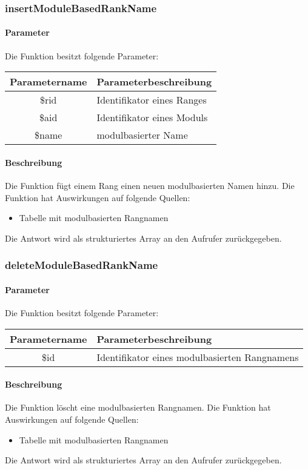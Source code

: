 \subsubsection{insertModuleBasedRankName}
\paragraph{Parameter} Die Funktion besitzt folgende Parameter:
\begin{table}[H]
	\begin{tabular}{|c|p{11cm}|}
		\hline
		\textbf{Parametername} & \textbf{Parameterbeschreibung} \\ \hline
		\$rid  & Identifikator eines Ranges \\ \hline
		\$aid  & Identifikator eines Moduls \\ \hline
		\$name & modulbasierter Name \\ \hline
	\end{tabular}
\end{table}
\paragraph{Beschreibung} Die Funktion fügt einem Rang einen neuen modulbasierten Namen hinzu. Die Funktion hat Auswirkungen auf folgende Quellen:
\begin{itemize}
	\item Tabelle mit modulbasierten Rangnamen
\end{itemize}
Die Antwort wird als strukturiertes Array an den Aufrufer zurückgegeben.
\subsubsection{deleteModuleBasedRankName}
\paragraph{Parameter} Die Funktion besitzt folgende Parameter:
\begin{table}[H]
	\begin{tabular}{|c|p{11cm}|}
		\hline
		\textbf{Parametername} & \textbf{Parameterbeschreibung} \\ \hline
		\$id  & Identifikator eines modulbasierten Rangnamens \\ \hline
	\end{tabular}
\end{table}
\paragraph{Beschreibung} Die Funktion löscht eine modulbasierten Rangnamen. Die Funktion hat Auswirkungen auf folgende Quellen:
\begin{itemize}
	\item Tabelle mit modulbasierten Rangnamen
\end{itemize}
Die Antwort wird als strukturiertes Array an den Aufrufer zurückgegeben.
